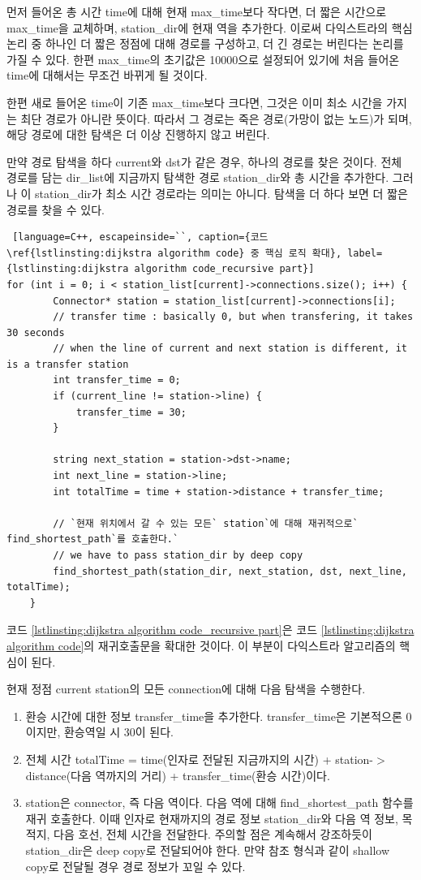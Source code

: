 \documentclass{article}
\begin{document}
먼저 들어온 총 시간 time에 대해 현재 max\_time보다 작다면, 더 짧은 시간으로 max\_time을 교체하며, station\_dir에 현재 역을 추가한다. 이로써 다익스트라의 핵심 논리 중 하나인 더 짧은 정점에 대해 경로를 구성하고, 더 긴 경로는 버린다는 논리를 가질 수 있다. 한편 max\_time의 초기값은 10000으로 설정되어 있기에 처음 들어온 time에 대해서는 무조건 바뀌게 될 것이다.

한편 새로 들어온 time이 기존 max\_time보다 크다면, 그것은 이미 최소 시간을 가지는 최단 경로가 아니란 뜻이다. 따라서 그 경로는 죽은 경로(가망이 없는 노드)가 되며, 해당 경로에 대한 탐색은 더 이상 진행하지 않고 버린다.

만약 경로 탐색을 하다 current와 dst가 같은 경우, 하나의 경로를 찾은 것이다. 전체 경로를 담는 dir\_list에 지금까지 탐색한 경로 station\_dir와 총 시간을 추가한다. 그러나 이 station\_dir가 최소 시간 경로라는 의미는 아니다. 탐색을 더 하다 보면 더 짧은 경로를 찾을 수 있다.

\begin{lstlisting} [language=C++, escapeinside=``, caption={코드 \ref{lstlinsting:dijkstra algorithm code} 중 핵심 로직 확대}, label={lstlinsting:dijkstra algorithm code_recursive part}]
for (int i = 0; i < station_list[current]->connections.size(); i++) {
		Connector* station = station_list[current]->connections[i];
		// transfer time : basically 0, but when transfering, it takes 30 seconds
		// when the line of current and next station is different, it is a transfer station
		int transfer_time = 0;
		if (current_line != station->line) {
			transfer_time = 30;
		}
		
		string next_station = station->dst->name;
		int next_line = station->line;
		int totalTime = time + station->distance + transfer_time;

		// `현재 위치에서 갈 수 있는 모든` station`에 대해 재귀적으로` find_shortest_path`를 호출한다.`
		// we have to pass station_dir by deep copy
		find_shortest_path(station_dir, next_station, dst, next_line, totalTime);
	}
\end{lstlisting}
코드 \ref{lstlinsting:dijkstra algorithm code_recursive part}은 코드 \ref{lstlinsting:dijkstra algorithm code}의 재귀호출문을 확대한 것이다. 이 부분이 다익스트라 알고리즘의 핵심이 된다. 

현재 정점 current station의 모든 connection에 대해 다음 탐색을 수행한다.
\begin{enumerate}
    \item 환승 시간에 대한 정보 transfer\_time을 추가한다. transfer\_time은 기본적으론 0이지만, 환승역일 시 30이 된다.
    \item 전체 시간 totalTime = time(인자로 전달된 지금까지의 시간) + station-$>$distance(다음 역까지의 거리) + transfer\_time(환승 시간)이다.
    \item station은 connector, 즉 다음 역이다. 다음 역에 대해 find\_shortest\_path 함수를 재귀 호출한다. 이때 인자로 현재까지의 경로 정보 station\_dir와 다음 역 정보, 목적지, 다음 호선, 전체 시간을 전달한다. 주의할 점은 계속해서 강조하듯이 station\_dir은 deep copy로 전달되어야 한다. 만약 참조 형식과 같이 shallow copy로 전달될 경우 경로 정보가 꼬일 수 있다.
\end{enumerate}
\end{document}
